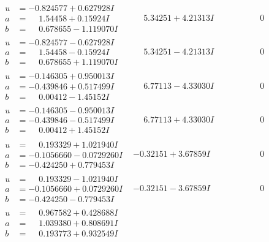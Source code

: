 \documentclass[1p]{elsarticle_modified}
\theoremstyle{definition}
\begin{document}
$$\begin{array}{c|c|c}
\begin{aligned}
u &= -0.824577 + 0.627928 I \\
a &= \phantom{-}1.54458 + 0.15924 I \\
b &= \phantom{-}0.678655 - 1.119070 I\end{aligned}
 & \phantom{-}5.34251 + 4.21313 I & \phantom{-0.000000 } 0 \\ \hline\begin{aligned}
u &= -0.824577 - 0.627928 I \\
a &= \phantom{-}1.54458 - 0.15924 I \\
b &= \phantom{-}0.678655 + 1.119070 I\end{aligned}
 & \phantom{-}5.34251 - 4.21313 I & \phantom{-0.000000 } 0 \\ \hline\begin{aligned}
u &= -0.146305 + 0.950013 I \\
a &= -0.439846 + 0.517499 I \\
b &= \phantom{-}0.00412 - 1.45152 I\end{aligned}
 & \phantom{-}6.77113 - 4.33030 I & \phantom{-0.000000 } 0 \\ \hline\begin{aligned}
u &= -0.146305 - 0.950013 I \\
a &= -0.439846 - 0.517499 I \\
b &= \phantom{-}0.00412 + 1.45152 I\end{aligned}
 & \phantom{-}6.77113 + 4.33030 I & \phantom{-0.000000 } 0 \\ \hline\begin{aligned}
u &= \phantom{-}0.193329 + 1.021940 I \\
a &= -0.1056660 - 0.0729260 I \\
b &= -0.424250 + 0.779453 I\end{aligned}
 & -0.32151 + 3.67859 I & \phantom{-0.000000 } 0 \\ \hline\begin{aligned}
u &= \phantom{-}0.193329 - 1.021940 I \\
a &= -0.1056660 + 0.0729260 I \\
b &= -0.424250 - 0.779453 I\end{aligned}
 & -0.32151 - 3.67859 I & \phantom{-0.000000 } 0 \\ \hline\begin{aligned}
u &= \phantom{-}0.967582 + 0.428688 I \\
a &= \phantom{-}1.039380 + 0.808691 I \\
b &= \phantom{-}0.193773 + 0.932549 I\end{aligned}

\end{array}$$
\end{document}
